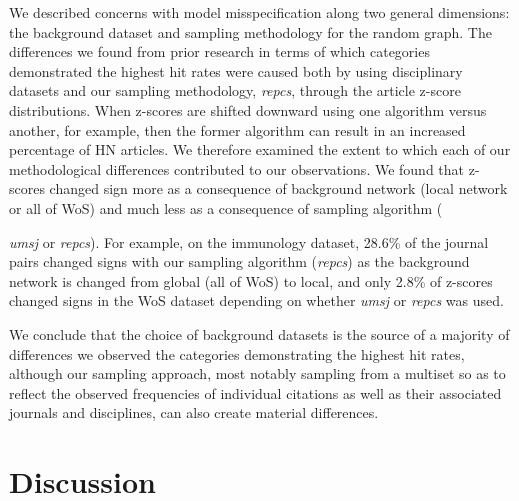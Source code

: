 \documentclass[NETN]{stjour}
\begin{document}
We described concerns with model misspecification along two general dimensions: the background dataset and sampling methodology for the random graph. The differences we found from prior research in terms of which categories demonstrated the highest hit rates were caused both by using disciplinary datasets and our sampling methodology, \textit{repcs},  through the article z-score distributions. 
When z-scores are shifted downward using one algorithm versus another, for example, then the former algorithm can result in an increased percentage of HN articles.
We therefore examined  the extent to which each of our methodological differences contributed to our observations.  
We found that z-scores changed sign more as a consequence of background network (local network or all of WoS) and much less as a consequence of sampling algorithm
 ({\textit{umsj} or \textit{repcs}). 
For example,  on the immunology dataset, 28.6\% of the journal pairs changed signs with our sampling algorithm (\textit{repcs}) as the background network is changed from global (all of WoS) to local, and 
only 2.8\% of z-scores changed signs in the WoS dataset depending on whether 
\textit{umsj} or \textit{repcs} was used. 



We conclude that the choice of background datasets is the source of a majority of differences we observed the categories demonstrating the highest hit rates, although our sampling approach, most notably sampling from a multiset so as to reflect the observed frequencies of individual citations as well as their associated journals and disciplines, can also create material differences.     

\section{Discussion}

}
\end{document}
